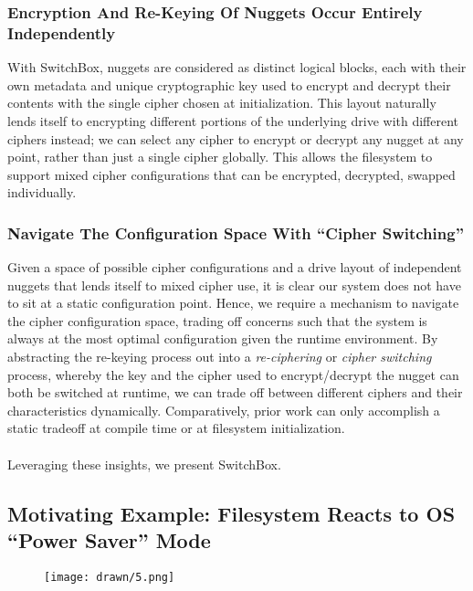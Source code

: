 \subsubsection{Encryption And Re-Keying Of Nuggets Occur Entirely Independently}

With SwitchBox, nuggets are considered as distinct logical blocks, each with
their own metadata and unique cryptographic key used to encrypt and decrypt
their contents with the single cipher chosen at initialization. This layout
naturally lends itself to encrypting different portions of the underlying drive
with different ciphers instead; we can select any cipher to encrypt or decrypt
any nugget at any point, rather than just a single cipher globally. This allows
the filesystem to support mixed cipher configurations that can be encrypted,
decrypted, swapped individually.

\subsubsection{Navigate The Configuration Space With ``Cipher Switching''}

Given a space of possible cipher configurations and a drive layout of
independent nuggets that lends itself to mixed cipher use, it is clear our
system does not have to sit at a static configuration point. Hence, we require a
mechanism to navigate the cipher configuration space, trading off concerns such
that the system is always at the most optimal configuration given the runtime
environment. By abstracting the re-keying process out into a \emph{re-ciphering}
or \emph{cipher switching} process, whereby the key and the cipher used to
encrypt/decrypt the nugget can both be switched at runtime, we can trade off
between different ciphers and their characteristics dynamically. Comparatively,
prior work can only accomplish a static tradeoff at compile time or at
filesystem initialization. \\
\\
Leveraging these insights, we present SwitchBox. 

\subsection{Motivating Example: Filesystem Reacts to OS ``Power Saver'' Mode}

\begin{figure}[ht]
   \centering
   \texttt{[image: drawn/5.png]}
   \caption{}\label{fig:energy-latency-linearity}
\end{figure}

